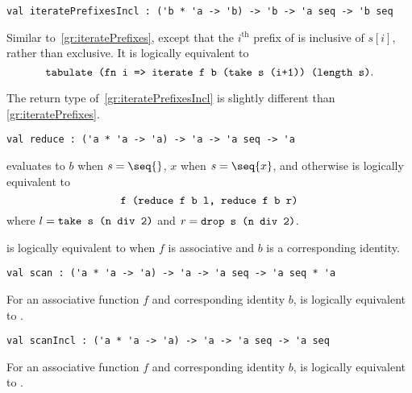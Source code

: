 \begin{group}
\begin{gram}[iteratePrefixesIncl]
\label{gr:iteratePrefixesIncl}
\begin{verbatim}
val iteratePrefixesIncl : ('b * 'a -> 'b) -> 'b -> 'a seq -> 'b seq
\end{verbatim}
Similar to~\ref{gr:iteratePrefixes}, except that the $i^\text{th}$ prefix of
 is inclusive of $s[i]$, rather than exclusive.
It is logically equivalent to
\[
  \texttt{tabulate (fn i => iterate f b (take s (i+1)) (length s)}.
\]
\end{gram}
\begin{note}
The return type of~\ref{gr:iteratePrefixesIncl} is slightly different than
\ref{gr:iteratePrefixes}.
\end{note}
\end{group}

\begin{group}
\begin{gram}[reduce]
\label{gr:reduce}
\begin{verbatim}
val reduce : ('a * 'a -> 'a) -> 'a -> 'a seq -> 'a
\end{verbatim}
 evaluates to $b$ when $s = \seq{}$,
$x$ when $s = \seq{x}$, and otherwise is logically equivalent to
\[
  \texttt{f (reduce f b l, reduce f b r)}
\]
where $l = \texttt{take s (n div 2)}$ and $r = \texttt{drop s (n div 2)}$.
\end{gram}
\begin{note}
 is logically equivalent to  when
$f$ is associative and $b$ is a corresponding identity.
\end{note}
\end{group}

\begin{gram}[scan]
\label{gr:scan}
\begin{verbatim}
val scan : ('a * 'a -> 'a) -> 'a -> 'a seq -> 'a seq * 'a
\end{verbatim}
For an associative function $f$ and corresponding identity $b$, 
is logically equivalent to .
\end{gram}

\begin{gram}[scanIncl]
\label{gr:scanIncl}
\begin{verbatim}
val scanIncl : ('a * 'a -> 'a) -> 'a -> 'a seq -> 'a seq
\end{verbatim}
For an associative function $f$ and corresponding identity $b$, 
is logically equivalent to .
\end{gram}

